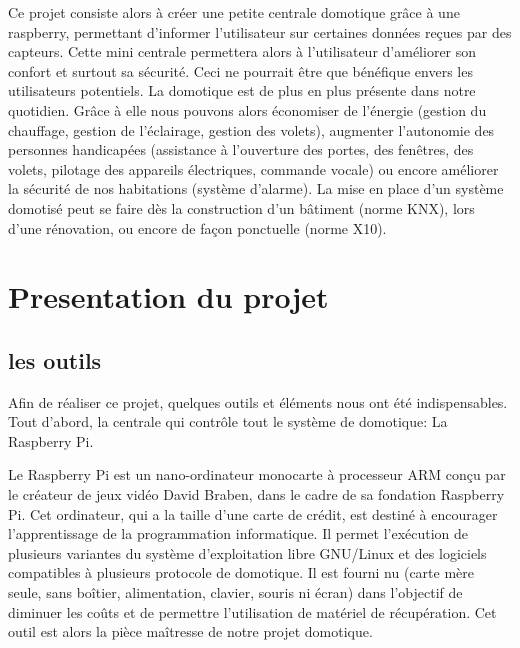 Ce projet consiste alors à créer une petite centrale domotique grâce à une raspberry, permettant d'informer l'utilisateur sur certaines données reçues par des capteurs. Cette mini centrale permettera alors à l'utilisateur d'améliorer son confort et surtout sa sécurité. Ceci ne pourrait être que bénéfique envers les utilisateurs potentiels. La domotique est de plus en plus présente dans notre quotidien. Grâce à elle nous pouvons alors économiser de l'énergie (gestion du chauffage, gestion de l'éclairage, gestion des volets), augmenter l'autonomie des personnes handicapées (assistance à l'ouverture des portes, des fenêtres, des volets, pilotage des appareils électriques, commande vocale) ou encore améliorer la sécurité de nos habitations (système d'alarme). La mise en place d'un système domotisé peut se faire dès la construction d'un bâtiment (norme KNX), lors d'une rénovation, ou encore de façon ponctuelle (norme X10).





\newpage
\chapter{Presentation du projet}
\section{les outils} 
Afin de réaliser ce projet, quelques outils et éléments nous ont été indispensables. Tout d'abord, la centrale qui contrôle tout le système de domotique: La Raspberry Pi.

Le Raspberry Pi est un nano-ordinateur monocarte à processeur ARM conçu par le créateur de jeux vidéo David Braben, dans le cadre de sa fondation Raspberry Pi. Cet ordinateur, qui a la taille d'une carte de crédit, est destiné à encourager l'apprentissage de la programmation informatique. Il permet l'exécution de plusieurs variantes du système d'exploitation libre GNU/Linux et des logiciels compatibles à plusieurs protocole de domotique. Il est fourni nu (carte mère seule, sans boîtier, alimentation, clavier, souris ni écran) dans l'objectif de diminuer les coûts et de permettre l'utilisation de matériel de récupération.
Cet outil est alors la pièce maîtresse de notre projet domotique. 

